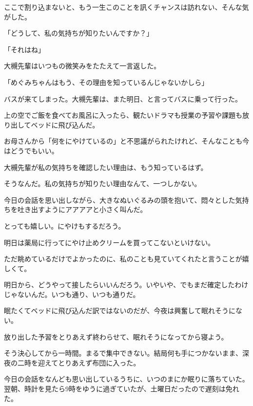 \documentclass[a4paper,dvipdfmx,12pt]{jsarticle}
\begin{document}
ここで割り込まないと、もう一生このことを訊くチャンスは訪れない、そんな気がした。

「どうして、私の気持ちが知りたいんですか？」

「それはね」

大槻先輩はいつもの微笑みをたたえて一言返した。

「めぐみちゃんはもう、その理由を知っているんじゃないかしら」

バスが来てしまった。大槻先輩は、また明日、と言ってバスに乗って行った。


上の空でご飯を食べてお風呂に入ったら、観たいドラマも授業の予習や課題も放り出してベッドに飛び込んだ。

お母さんから「何をにやけているの」と不思議がられたけれど、そんなことも今はどうでもいい。

大槻先輩が私の気持ちを確認したい理由は、もう知っているはず。

そうなんだ。私の気持ちが知りたい理由なんて、一つしかない。

今日の会話を思い出しながら、大きなぬいぐるみの頭を抱いて、悶々とした気持ちを吐き出すようにアアアアと小さく叫んだ。

とっても嬉しい。にやけもするだろう。

明日は薬局に行ってにやけ止めクリームを買ってこないといけない。


ただ眺めているだけでよかったのに、私のことも見ていてくれたと言うことが嬉しくて。

明日から、どうやって接したらいいんだろう。いやいや、でもまだ確定したわけじゃないんだ。いつも通り、いつも通りだ。

眠たくてベッドに飛び込んだ訳ではないのだが、今夜は興奮して眠れそうにない。

放り出した予習をとりあえず終わらせて、眠れそうになってから寝よう。

そう決心してから一時間。まるで集中できない。結局何も手につかないまま、深夜の二時を迎えてとりあえず布団に入った。

今日の会話をなんども思い出しているうちに、いつのまにか眠りに落ちていた。翌朝、時計を見たら9時をゆうに過ぎていたが、土曜日だったので遅刻は免れた。
\end{document}
